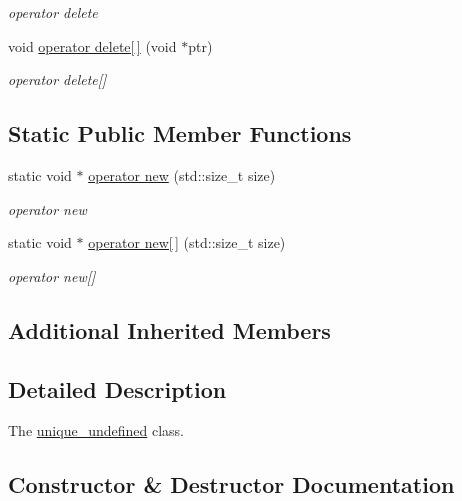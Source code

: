 \begin{DoxyCompactItemize}
\begin{DoxyCompactList}\small\item\em operator delete \end{DoxyCompactList}\item 
void \hyperlink{classformat_1_1unique__undefined_a6924635e275064b975384443a67d0579}{operator delete\mbox{[}$\,$\mbox{]}} (void $\ast$ptr)\hypertarget{classformat_1_1unique__undefined_a6924635e275064b975384443a67d0579}{}\label{classformat_1_1unique__undefined_a6924635e275064b975384443a67d0579}

\begin{DoxyCompactList}\small\item\em operator delete\mbox{[}\mbox{]} \end{DoxyCompactList}\end{DoxyCompactItemize}
\subsection*{Static Public Member Functions}
\begin{DoxyCompactItemize}
\item 
static void $\ast$ \hyperlink{classformat_1_1unique__undefined_ab0561911ee891679e009bf3c09aa4ef1}{operator new} (std\+::size\+\_\+t size)
\begin{DoxyCompactList}\small\item\em operator new \end{DoxyCompactList}\item 
static void $\ast$ \hyperlink{classformat_1_1unique__undefined_a89eb80d7eb9e00051bacad091321172c}{operator new\mbox{[}$\,$\mbox{]}} (std\+::size\+\_\+t size)
\begin{DoxyCompactList}\small\item\em operator new\mbox{[}\mbox{]} \end{DoxyCompactList}\end{DoxyCompactItemize}
\subsection*{Additional Inherited Members}


\subsection{Detailed Description}
The \hyperlink{classformat_1_1unique__undefined}{unique\+\_\+undefined} class. 

\subsection{Constructor \& Destructor Documentation}
